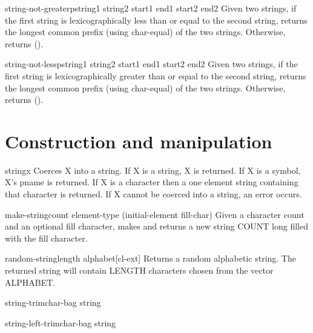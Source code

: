 \documentclass[10pt,english]{book}
\begin{document}
\begin{function}{string-not-greaterp}{string1 string2 \key start1 end1 start2 end2}
  Given two strings, if the first string is lexicographically less than
  or equal to the second string, returns the longest common prefix
  (using char-equal) of the two strings. Otherwise, returns ().
\end{function}

\begin{function}{string-not-lessp}{string1 string2 \key start1 end1 start2 end2}
  Given two strings, if the first string is lexicographically greater
  than or equal to the second string, returns the longest common prefix
  (using char-equal) of the two strings. Otherwise, returns ().
\end{function}

\section{Construction and manipulation}
\label{sec:constr-manip}

\begin{function}{string}{x}
  Coerces X into a string. If X is a string, X is returned. If X is a
   symbol, X's pname is returned. If X is a character then a one element
   string containing that character is returned. If X cannot be coerced
   into a string, an error occurs.
\end{function}

\begin{function}{make-string}{count \key element-type (initial-element fill-char)}
  Given a character count and an optional fill character, makes and returns a
new string COUNT long filled with the fill character.
\end{function}

\begin{function}{random-string}{\op length alphabet}[cl-ext]
  Returns a random alphabetic string. The returned string will contain
  LENGTH characters chosen from the vector ALPHABET.
\end{function}

\begin{function}{string-trim}{char-bag string}
  
\end{function}

\begin{function}{string-left-trim}{char-bag string}
  
\end{function}
\end{document}
